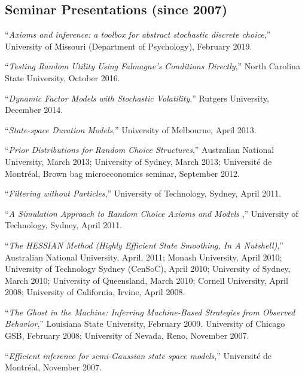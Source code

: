 \documentclass[12pt]{article}
\begin{document}

\subsection*{Seminar Presentations (since 2007)}

``{\it Axioms and inference: a toolbox for abstract stochastic discrete choice},''
University of Missouri (Department of Psychology), February 2019.

``{\it Testing Random Utility Using Falmagne's Conditions Directly},''
North Carolina State University, October 2016.

``{\it Dynamic Factor Models with Stochastic Volatility},''
Rutgers University, December 2014.

``{\it State-space Duration Models},''
University of Melbourne, April 2013.

``{\it Prior Distributions for Random Choice Structures},''
Australian National University, March 2013;
University of Sydney, March 2013;
Universit\'e de Montr\'eal, Brown bag microeconomics seminar, September 2012.

``{\it Filtering without Particles},''
University of Technology, Sydney, April 2011.

``{\it A Simulation Approach to Random Choice Axioms and Models },''
University of Technology, Sydney, April 2011.

``{\it The HESSIAN Method (Highly Efficient State Smoothing, In A Nutshell)},''
Australian National University, April, 2011;
Monash University, April 2010;
University of Technology Sydney (CenSoC), April 2010;
University of Sydney, March 2010;
University of Queensland, March 2010;
Cornell University, April 2008;
University of California, Irvine, April 2008.

``{\it The Ghost in the Machine: Inferring Machine-Based Strategies from Observed Behavior},'' 
Louisiana State University, February 2009.
University of Chicago GSB, February 2008;
University of Nevada, Reno, November 2007.

``{\it Efficient inference for semi-Gaussian state space models},''
Universit\'e de Montr\'eal, November 2007.

\end{document}

